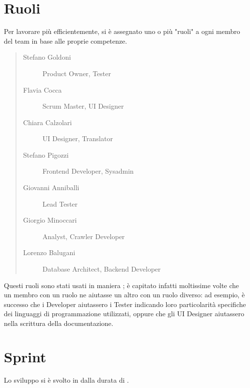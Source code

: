 \documentclass[letterpaper,10pt,italian]{sphinxmanual}
\begin{document}
\section{Ruoli}
\label{\detokenize{development/process:ruoli}}
\sphinxAtStartPar
Per lavorare più efficientemente, si è assegnato uno o più "ruoli" a ogni membro del team in base alle proprie
competenze.
\begin{quote}\begin{description}
\item[{Stefano Goldoni}] \leavevmode
\sphinxAtStartPar
Product Owner, Tester

\item[{Flavia Cocca}] \leavevmode
\sphinxAtStartPar
Scrum Master, UI Designer

\item[{Chiara Calzolari}] \leavevmode
\sphinxAtStartPar
UI Designer, Translator

\item[{Stefano Pigozzi}] \leavevmode
\sphinxAtStartPar
Frontend Developer, Sysadmin

\item[{Giovanni Anniballi}] \leavevmode
\sphinxAtStartPar
Lead Tester

\item[{Giorgio Minoccari}] \leavevmode
\sphinxAtStartPar
Analyst, Crawler Developer

\item[{Lorenzo Balugani}] \leavevmode
\sphinxAtStartPar
Database Architect, Backend Developer

\end{description}\end{quote}

\sphinxAtStartPar
Questi ruoli sono stati usati in maniera ; è capitato infatti moltissime volte che un membro con un ruolo
ne aiutasse un altro con un ruolo diverso: ad esempio, è successo che i Developer aiutassero i Tester indicando loro
particolarità specifiche dei linguaggi di programmazione utilizzati, oppure che gli UI Designer aiutassero nella
scrittura della documentazione.


\section{Sprint}
\label{\detokenize{development/process:sprint}}
\sphinxAtStartPar
Lo sviluppo si è svolto in  dalla durata di .
\end{document}
